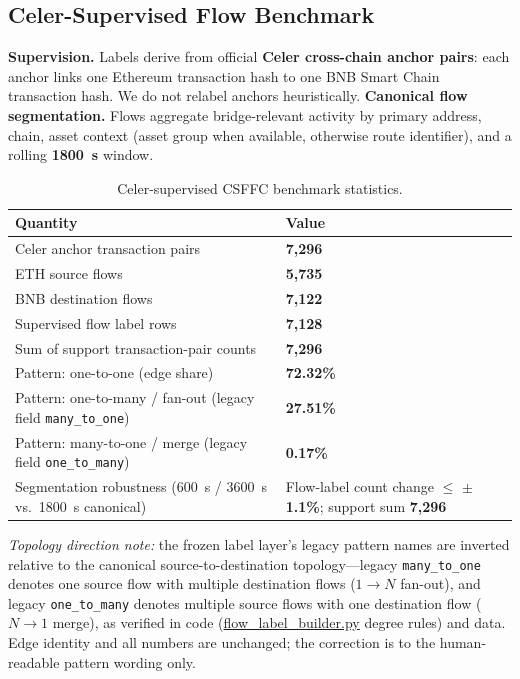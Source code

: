 \subsection{Celer-Supervised Flow Benchmark}
\label{sec:benchmark}

\textbf{Supervision.} Labels derive from official \textbf{Celer cross-chain anchor pairs}: each anchor links one Ethereum transaction hash to one BNB Smart Chain transaction hash. We do not relabel anchors heuristically. \textbf{Canonical flow segmentation.} Flows aggregate bridge-relevant activity by primary address, chain, asset context (asset group when available, otherwise route identifier), and a rolling \textbf{1800~s} window.

\begin{table}[!t]
\caption{Celer-supervised CSFFC benchmark statistics.}
\label{tab:benchmark}
\centering
\begin{tabular}{L{0.56\columnwidth}p{0.34\columnwidth}}
\toprule
Quantity & Value \\
\midrule
Celer anchor transaction pairs & \textbf{7{,}296} \\
ETH source flows & \textbf{5{,}735} \\
BNB destination flows & \textbf{7{,}122} \\
Supervised flow label rows & \textbf{7{,}128} \\
Sum of support transaction-pair counts & \textbf{7{,}296} \\
Pattern: one-to-one (edge share) & \textbf{72.32\%} \\
Pattern: one-to-many / fan-out (legacy field \texttt{many\_to\_one}) & \textbf{27.51\%} \\
Pattern: many-to-one / merge (legacy field \texttt{one\_to\_many}) & \textbf{0.17\%} \\
Segmentation robustness (600~s / 3600~s vs.\ 1800~s canonical) & Flow-label count change $\le$ \textbf{$\pm$1.1\%}; support sum \textbf{7{,}296} \\
\bottomrule
\end{tabular}
\end{table}

\emph{Topology direction note:} the frozen label layer's legacy pattern names are inverted relative to the canonical source-to-destination topology---legacy \texttt{many\_to\_one} denotes one source flow with multiple destination flows ($1{\to}N$ fan-out), and legacy \texttt{one\_to\_many} denotes multiple source flows with one destination flow ($N{\to}1$ merge), as verified in code (\url{flow_label_builder.py} degree rules) and data. Edge identity and all numbers are unchanged; the correction is to the human-readable pattern wording only.

